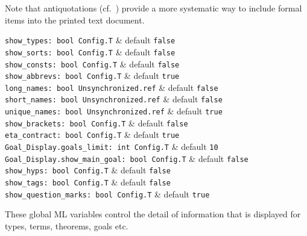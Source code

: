 \begin{isabellebody}
\begin{isamarkuptext}
  Note that antiquotations (cf.\ ) provide a more
  systematic way to include formal items into the printed text
  document.%
\end{isamarkuptext}%
\isamarkuptrue%
%
\isamarkuptrue%
%
\begin{isamarkuptext}%
\begin{mldecls} 
    \verb|show_types: bool Config.T| & default \verb|false| \\
    \verb|show_sorts: bool Config.T| & default \verb|false| \\
    \verb|show_consts: bool Config.T| & default \verb|false| \\
    \verb|show_abbrevs: bool Config.T| & default \verb|true| \\
    \verb|long_names: bool Unsynchronized.ref| & default \verb|false| \\
    \verb|short_names: bool Unsynchronized.ref| & default \verb|false| \\
    \verb|unique_names: bool Unsynchronized.ref| & default \verb|true| \\
    \verb|show_brackets: bool Config.T| & default \verb|false| \\
    \verb|eta_contract: bool Config.T| & default \verb|true| \\
    \verb|Goal_Display.goals_limit: int Config.T| & default \verb|10| \\
    \verb|Goal_Display.show_main_goal: bool Config.T| & default \verb|false| \\
    \verb|show_hyps: bool Config.T| & default \verb|false| \\
    \verb|show_tags: bool Config.T| & default \verb|false| \\
    \verb|show_question_marks: bool Config.T| & default \verb|true| \\
  \end{mldecls}

  These global ML variables control the detail of information that is
  displayed for types, terms, theorems, goals etc.


\end{isamarkuptext}
\end{isabellebody}
